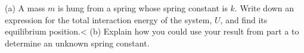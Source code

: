 (a) A mass $m$ is hung from a spring whose spring constant is $k$. Write down
        an expression for the total interaction energy of the system, $U$, and find its equilibrium
        position.<%
        (b) Explain how you could use your result from part a to determine an unknown
        spring constant.
